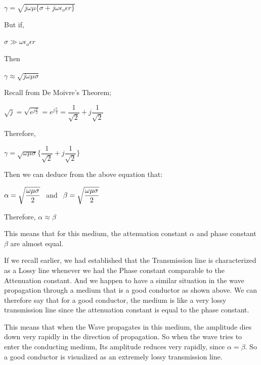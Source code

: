 \begin{center}
$\gamma=\sqrt{j\omega\mu\{\sigma+j\omega\epsilon_{o}\epsilon{r}\}}$	
\end{center}

But if, 
\begin{center}
$\sigma\gg\omega\epsilon_{o}\epsilon{r}$
\end{center}

Then

$\gamma\approx\sqrt{j\omega\mu\sigma}$

Recall from De Moivre's Theorem;	

\begin{center}
$\sqrt{j}=\sqrt{e^{j\frac{\pi}{2}}}=e^{j\frac{\pi}{4}}=\dfrac{1}{\sqrt{2}}+j\dfrac{1}{\sqrt{2}}$
\end{center}

Therefore,

\begin{center}		
$\gamma = \sqrt{\omega\mu\sigma}\{\dfrac{1}{\sqrt{2}}+j\dfrac{1}{\sqrt{2}}\}$

\end{center}

Then we can deduce from the above equation that:

\begin{center}

$\alpha=\sqrt{\dfrac{\omega\mu\sigma}{2}}\hspace{0.15cm}$ and $\hspace{0.15cm}\beta=\sqrt{\dfrac{\omega\mu\sigma}{2}}$

\end{center}

Therefore,
$\alpha\approx\beta$

This means that for this medium, the attenuation constant $\alpha$ and phase constant $\beta$ are almost equal.

If we recall earlier, we had established that the Transmission line is characterized as a Lossy line whenever we had the Phase constant comparable to the Attenuation constant. And we happen to have a similar situation in the wave propagation through a medium that is a good conductor as shown above. We can therefore say that for a good conductor, the medium is like a very lossy transmission line since the attenuation constant is equal to the phase constant.

This means that when the Wave propagates in this medium, the amplitude dies down very rapidly in the direction of propagation. So when the wave tries to enter the conducting medium, Its amplitude reduces very rapidly, since $\alpha=\beta$. So a good conductor is visualized as an extremely lossy transmission line.


